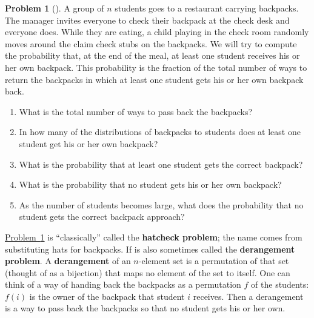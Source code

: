 \documentclass[10pt,]{book}
\newcommand{\terminology}[1]{\textbf{#1}}
\theoremstyle{plain}
\theoremstyle{definition}
\newtheorem{activity}[project]{Problem}
\theoremstyle{definition}
\numberwithin{equation}{chapter}
\newcommand{\importantarrow}{\Rightarrow}
\begin{document}
\begin{activity}[] \label{hatcheck}
A group of \(n\) students goes to a restaurant carrying backpacks. The manager invites everyone to check their backpack at the check desk and everyone does. While they are eating, a child playing in the check room randomly moves around the claim check stubs on the backpacks. We will try to compute the probability that, at the end of the meal, at least one student receives his or her own backpack.  This probability is the fraction of the total number of ways to return the backpacks in which at least one student gets his or her own backpack back.%
\begin{enumerate}[font=\bfseries,label=(\alph*),ref=\alph*]
\item\label{task-168} \marginsymbol[-2.5em]{} What is the total number of ways to pass back the backpacks?%
\item\label{task-169} \marginsymbol[-2.5em]{} In how many of the distributions of backpacks to students does at least one student get his or her own backpack?%
\item\label{task-170} \marginsymbol[-2.5em]{} What is the probability that at least one student gets the correct backpack?%
\item\label{hatcheckprobpart} \marginsymbol[-2.5em]{} What is the probability that no student gets his or her own backpack?%
\item\label{task-172} \marginsymbol[-2.5em]{\pdftooltip{$\importantarrow$}{especially interesting}} As the number of students becomes large, what does the probability that no student gets the correct backpack approach?%
\end{enumerate}
\end{activity}
\hyperref[hatcheck]{Problem~\ref{hatcheck}} is ``classically'' called the \terminology{hatcheck problem}; the name comes from substituting hats for backpacks. If is also sometimes called the \terminology{derangement problem}. A \terminology{derangement} of an \(n\)-element set is a permutation of that set (thought of as a bijection) that maps no element of the set to itself. One can think of a way of handing back the backpacks as a permutation \(f\) of the students: \(f(i)\) is the owner of the backpack that student \(i\) receives. Then a derangement is a way to pass back the backpacks so that no student gets his or her own.%
\typeout{************************************************}
\typeout{************************************************}
\end{document}

